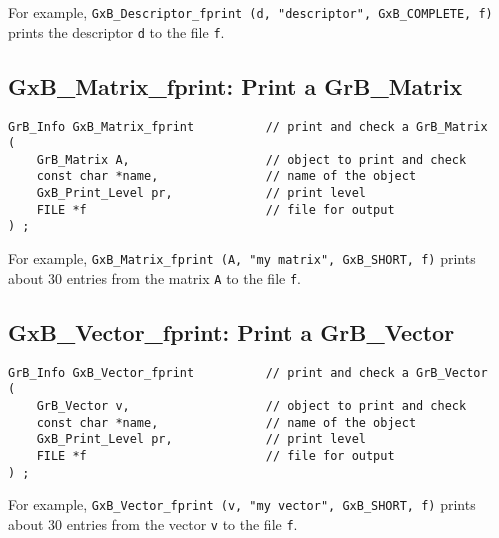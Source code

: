 \documentclass[12pt]{article}
\begin{document}
For example,
\verb'GxB_Descriptor_fprint (d, "descriptor", GxB_COMPLETE, f)'
prints the descriptor \verb'd' to the file \verb'f'.

\newpage
\subsection{{\sf GxB\_Matrix\_fprint:} Print a {\sf GrB\_Matrix}}

\begin{mdframed}[userdefinedwidth=6in]
{\footnotesize
\begin{verbatim}
GrB_Info GxB_Matrix_fprint          // print and check a GrB_Matrix
(
    GrB_Matrix A,                   // object to print and check
    const char *name,               // name of the object
    GxB_Print_Level pr,             // print level
    FILE *f                         // file for output
) ;
\end{verbatim} } \end{mdframed}

For example, \verb'GxB_Matrix_fprint (A, "my matrix", GxB_SHORT, f)'
prints about 30 entries from the matrix \verb'A' to the file \verb'f'.


\subsection{{\sf GxB\_Vector\_fprint:} Print a {\sf GrB\_Vector}}

\begin{mdframed}[userdefinedwidth=6in]
{\footnotesize
\begin{verbatim}
GrB_Info GxB_Vector_fprint          // print and check a GrB_Vector
(
    GrB_Vector v,                   // object to print and check
    const char *name,               // name of the object
    GxB_Print_Level pr,             // print level
    FILE *f                         // file for output
) ;
\end{verbatim} } \end{mdframed}

For example, \verb'GxB_Vector_fprint (v, "my vector", GxB_SHORT, f)'
prints about 30 entries from the vector \verb'v' to the file \verb'f'.
\end{document}
